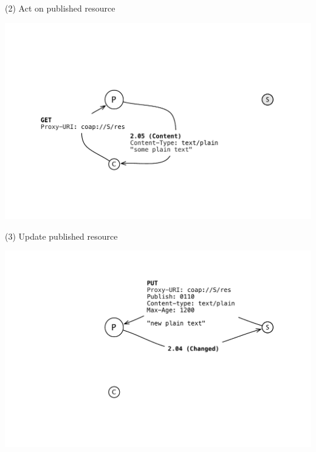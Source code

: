 \documentclass{beamer}
\begin{document}
\begin{frame}{(2) Act on published resource}
 \begin{center}
  \includegraphics[width=\textwidth]{../../share/images/publish1.pdf}
 \end{center}
\end{frame}

\begin{frame}{(3) Update published resource}
 \begin{center}
  \includegraphics[width=\textwidth]{../../share/images/publish2.pdf}
 \end{center}
\end{frame}
\end{document}
